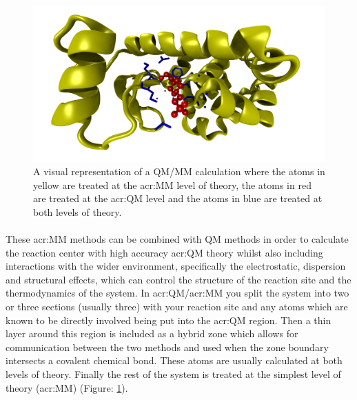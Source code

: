 \begin{figure}[H]
    \centering
    \includegraphics[width=\textwidth]{Graphics/Theory/QMMM.png}
    \caption{A visual representation of a QM/MM calculation where the atoms in yellow are treated at the \gls{acr:MM} level of theory, the atoms in red are treated at the \gls{acr:QM} level and the atoms in blue are treated at both levels of theory.}
    \label{fig:QMMM}
\end{figure}

\paragraph{}
These \gls{acr:MM} methods can be combined with QM methods in order to calculate the reaction center with high accuracy \gls{acr:QM} theory whilst also including interactions with the wider environment, specifically the electrostatic, dispersion and structural effects, which can control the structure of the reaction site and the thermodynamics of the system. In \gls{acr:QM}/\gls{acr:MM} you split the system into two or three sections (usually three) with your reaction site and any atoms which are known to be directly involved being put into the \gls{acr:QM} region. Then a thin layer around this region is included  as a hybrid zone which allows for communication between the two methods and used when the zone boundary intersects a covalent chemical bond. These atoms are usually calculated at both levels of theory. Finally the rest of the system is treated at the simplest level of theory (\gls{acr:MM}) (Figure: \ref{fig:QMMM}).